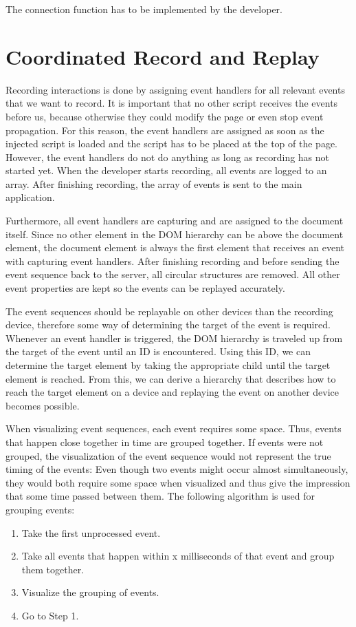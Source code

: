 The connection function has to be implemented by the developer.

\section{Coordinated Record and Replay}

Recording interactions is done by assigning event handlers for all relevant events that we want to record. It is important that no other script receives the events before us, because otherwise they could modify the page or even stop event propagation. For this reason, the event handlers are assigned as soon as the injected script is loaded and the script has to be placed at the top of the page. However, the event handlers do not do anything as long as recording has not started yet. When the developer starts recording, all events are logged to an array. After finishing recording, the array of events is sent to the main application. 

Furthermore, all event handlers are capturing and are assigned to the document itself. Since no other element in the DOM hierarchy can be above the document element, the document element is always the first element that receives an event with capturing event handlers. After finishing recording and before sending the event sequence back to the server, all circular structures are removed. All other event properties are kept so the events can be replayed accurately.

The event sequences should be replayable on other devices than the recording device, therefore some way of determining the target of the event is required. Whenever an event handler is triggered, the DOM hierarchy is traveled up from the target of the event until an ID is encountered. Using this ID, we can determine the target element by taking the appropriate child until the target element is reached. From this, we can derive a hierarchy that describes how to reach the target element on a device and replaying the event on another device becomes possible.

When visualizing event sequences, each event requires some space. Thus, events that happen close together in time are grouped together. If events were not grouped, the visualization of the event sequence would not represent the true timing of the events: Even though two events might occur almost simultaneously, they would both require some space when visualized and thus give the impression that some time passed between them. The following algorithm is used for grouping events:
\begin{enumerate}
	\item Take the first unprocessed event.
	\item Take all events that happen within x milliseconds of that event and group them together.
	\item Visualize the grouping of events.
	\item Go to Step 1.
\end{enumerate}


